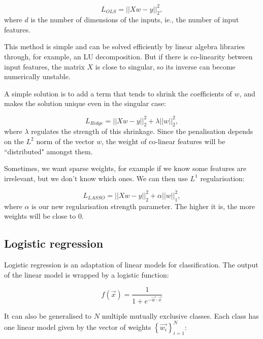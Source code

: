 \begin{equation*}
 L_{OLS} = || X w -y ||_2 ^2,
\end{equation*}
where $d$ is the number of dimensions of the inputs, ie., the number of input features.

This method is simple and can be solved efficiently by linear algebra libraries through, for example, an LU decomposition.
But if there is co-linearity between input features, the matrix $X$ is close to singular, so its inverse can become numerically unstable.

A simple solution  is to add a term that tends to shrink the coefficients of $w$, and makes the solution unique even in the singular case:

\[ L_{Ridge} = || X w -y ||_2 ^2 + \lambda ||w||_2^2,\]
where $\lambda$ regulates the strength of this shrinkage.
Since the penalisation depends on the $L^2$ norm of the vector $w$, the weight of co-linear features will be ``distributed" amongst them.

Sometimes, we want sparse weights,  for example if we know some features are irrelevant, but we don't know which ones.
We can then use $L^1$ regularisation:

\[ L_{LASSO} = || X w -y ||_2 ^2 + \alpha ||w||_1^2,\]
where $\alpha$ is our new regularisation strength parameter.
The higher it is, the more weights will be close to $0$.


\subsection{Logistic regression}\label{sec:logistic_regression}
Logistic regression  is an adaptation of linear models for classification.
The output of the linear model is wrapped by a logistic function:

\begin{equation*}
f(\vec x) = \frac{1}{1 + e^{- \vec{w} \cdot \vec x}}
\end{equation*}

It can also be generalised to $N$ multiple mutually exclusive classes.
Each class has one linear model given by the vector of weights $\left\{\vec{w_i}\right\}_{i=1} ^N$:


